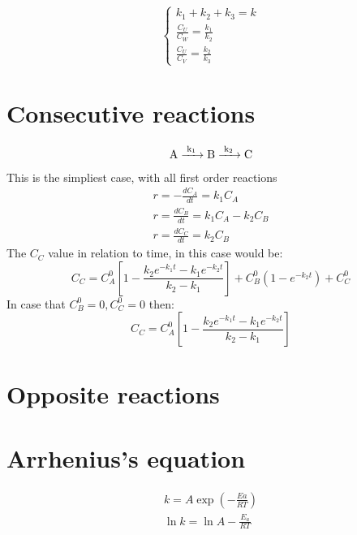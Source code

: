 \documentclass[../Master.tex]{subfiles}
\begin{document}
\begin{multicols*}{2}
	\begin{equation*}
		\begin{cases}
			k_{1} + k_{2} + k_{3} = k                  \\
			\frac{C_{U}}{C_{W} } = \frac{k_{1}}{k_{2}} \\
			\frac{C_{U} }{C_{V}} = \frac{k_{2}}{k_{3}}
		\end{cases}
	\end{equation*}

	\section{Consecutive reactions}
	\begin{gather*}
		\ce{ A ->[{k_{1}}] B ->[{k_{2}}]C}\\
	\end{gather*}
	This is the simpliest case, with all first order reactions
	\begin{gather*}
		r = -\frac{dC_{A}}{dt} = k_{1}C_{A}\\
		r = \frac{dC_{B}}{dt} = k_{1}C_{A} - k_{2}C_{B}\\
		r = \frac{dC_{C}}{dt} = k_{2}C_{B}
	\end{gather*}
	The $C_{C}$ value in relation to time, in this case would be:
	\[
		C_{C} = C_{A}^{0}\left[1 -\frac{k_{2}e^{-k_{1}t} -k_{1}e^{-k_{2}t}}{k_{2}-k_{1}} \right] + C_{B}^{0}(1-e^{-k_{2}t})+C_{C}^{0}
	\]
	In case that \( C_{B}^0=0, C_{C}^0 = 0 \) then:
	\[
		C_{C} = C_{A}^{0}\left[1 -\frac{k_{2}e^{-k_{1}t} -k_{1}e^{-k_{2}t}}{k_{2}-k_{1}} \right]
	\]
	\section{Opposite reactions}

	\section{Arrhenius's equation}
	\begin{gather*}
		k = A \exp \left( -\frac{Ea}{RT} \right)\\
		\ln k = \ln A - \frac{E_{a}}{RT}
	\end{gather*}
\end{multicols*}
\end{document}
